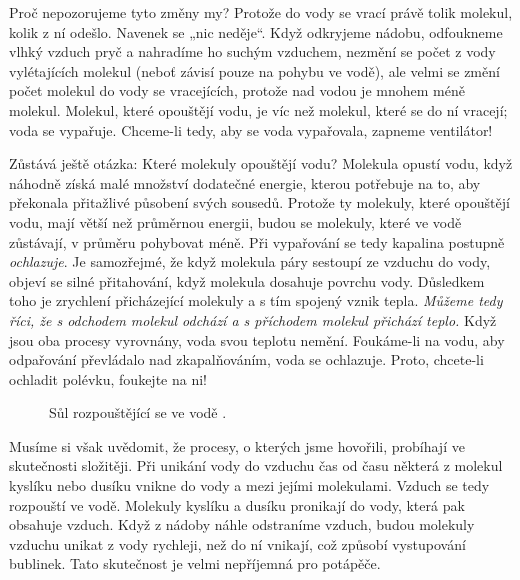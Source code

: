     Proč nepozorujeme tyto změny my? Protože do vody se vrací právě tolik molekul, kolik z ní
    odešlo. Navenek se „nic neděje“. Když odkryjeme nádobu, odfoukneme vlhký vzduch pryč a nahradíme
    ho suchým vzduchem, nezmění se počet z vody vylétajících molekul (neboť závisí pouze na pohybu
    ve vodě), ale velmi se změní počet molekul do vody se vracejících, protože nad vodou je mnohem
    méně molekul. Molekul, které opouštějí vodu, je víc než molekul, které se do ní vracejí; voda se
    vypařuje. Chceme-li tedy, aby se voda vypařovala, zapneme ventilátor!
    
    Zůstává ještě otázka: Které molekuly opouštějí vodu? Molekula opustí vodu, když náhodně získá
    malé množství dodatečné energie, kterou potřebuje na to, aby překonala přitažlivé působení svých
    sousedů. Protože ty molekuly, které opouštějí vodu, mají větší než průměrnou energii, budou se
    molekuly, které ve vodě zůstávají, v průměru pohybovat méně. Při vypařování se tedy kapalina
    postupně \emph{ochlazuje}. Je samozřejmé, že když molekula páry sestoupí ze vzduchu do vody,
    objeví se silné přitahování, když molekula dosahuje povrchu vody. Důsledkem toho je zrychlení
    přicházející molekuly a s tím spojený vznik tepla. \emph{Můžeme tedy říci, že s odchodem molekul
    odchází a s příchodem molekul přichází teplo.} Když jsou oba procesy vyrovnány, voda svou
    teplotu nemění. Foukáme-li na vodu, aby odpařování převládalo nad zkapalňováním, voda se
    ochlazuje. Proto, chcete-li ochladit polévku, foukejte na ni!
    
    \begin{figure}[ht!]    %
      \centering
      \caption{Sůl rozpouštějící se ve vodě \cite[s.~21]{Feynman01}.}
      \label{fyz:fig0012}
    \end{figure}

    Musíme si však uvědomit, že procesy, o kterých jsme hovořili, probíhají ve skutečnosti
    složitěji. Při unikání vody do vzduchu čas od času některá z molekul kyslíku nebo dusíku vnikne
    do vody a  mezi jejími molekulami. Vzduch se tedy rozpouští ve vodě. Molekuly
    kyslíku a dusíku pronikají do vody, která pak obsahuje vzduch. Když z nádoby náhle odstraníme
    vzduch, budou molekuly vzduchu unikat z vody rychleji, než do ní vnikají, což způsobí
    vystupování bublinek. Tato skutečnost je velmi nepříjemná pro potápěče.
  

